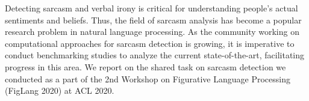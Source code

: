 Detecting sarcasm and verbal irony is critical for  understanding  people's  actual  sentiments and beliefs. Thus, the field of sarcasm analysis has become a popular research problem in natural language processing.  As the community working on computational approaches for sarcasm detection is growing, it is imperative to conduct benchmarking studies to analyze the current state-of-the-art, facilitating progress in this area.  We report on the shared task on sarcasm detection we conducted as a part of the 2nd  Workshop  on  Figurative  Language  Processing (FigLang 2020) at ACL 2020.
